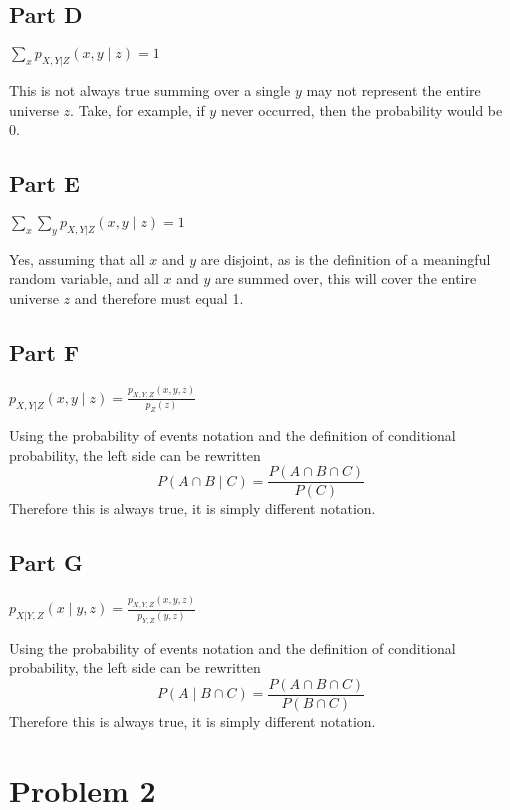 \documentclass{article}
\begin{document}
\subsection*{Part D}

\textit{$ \sum\limits_x p_{X,Y|Z}(x, y \mid z) = 1 $}

\bigbreak

This is not always true summing over a single $ y $ may not represent the
entire universe $ z $. Take, for example, if $ y $ never occurred, then
the probability would be $ 0 $.

\subsection*{Part E}

\textit{$ \sum\limits_x\sum\limits_y p_{X,Y|Z}(x, y \mid z) = 1 $}

\bigbreak

Yes, assuming that all $ x $ and $ y $ are disjoint, as is the definition
of a meaningful random variable, and all $ x $ and $ y $ are summed over,
this will cover the entire universe $ z $ and therefore must equal 1.

\subsection*{Part F}

\textit{$ p_{X,Y|Z}(x, y \mid z) = \frac{p_{X,Y,Z}(x, y, z)}{p_Z(z)} $}

\bigbreak

Using the probability of events notation and the definition of conditional
probability, the left side can be rewritten
$$ P(A \cap B \mid C) = \frac{P(A \cap B \cap C)}{P(C)} $$
Therefore this is always true, it is simply different notation.

\subsection*{Part G}

\textit{$ p_{X|Y,Z}(x \mid y, z) = \frac{p_{X,Y,Z}(x, y, z)}{p_{Y,Z}(y, z)} $}

\bigbreak

Using the probability of events notation and the definition of conditional
probability, the left side can be rewritten
$$ P(A \mid B \cap C) = \frac{P(A \cap B \cap C)}{P(B \cap C)} $$
Therefore this is always true, it is simply different notation.

\section*{Problem 2}
\end{document}
